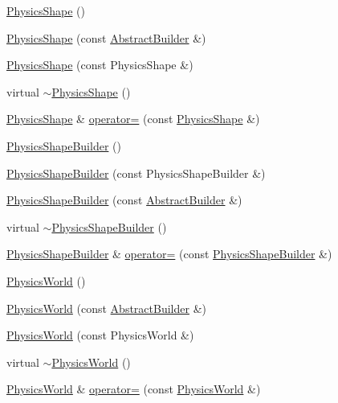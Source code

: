 \begin{DoxyCompactItemize}
\item 
\hyperlink{namespacejli_a5d762365fd3979a5b8f4eebe8a916892}{Physics\+Shape} ()
\item 
\hyperlink{namespacejli_a2c1e26825311f621ee078252a29461ca}{Physics\+Shape} (const \hyperlink{classjli_1_1_abstract_builder}{Abstract\+Builder} \&)
\item 
\hyperlink{namespacejli_a972bcb3073388c79c38278a37c0fba83}{Physics\+Shape} (const Physics\+Shape \&)
\item 
virtual \hyperlink{namespacejli_afd6ccdd598deb11b40538c5fad1b5477}{$\sim$\+Physics\+Shape} ()
\item 
\hyperlink{namespacejli_a5d762365fd3979a5b8f4eebe8a916892}{Physics\+Shape} \& \hyperlink{namespacejli_a7e2664c542fe138299889c24fca38c7e}{operator=} (const \hyperlink{namespacejli_a5d762365fd3979a5b8f4eebe8a916892}{Physics\+Shape} \&)
\item 
\hyperlink{namespacejli_a24992ac1c3858db95ba078eac205adc7}{Physics\+Shape\+Builder} ()
\item 
\hyperlink{namespacejli_af8521f0e610100e574ceb1c001582b5a}{Physics\+Shape\+Builder} (const Physics\+Shape\+Builder \&)
\item 
\hyperlink{namespacejli_a7506589a40ec7b7bd1b48d258fdc1330}{Physics\+Shape\+Builder} (const \hyperlink{classjli_1_1_abstract_builder}{Abstract\+Builder} \&)
\item 
virtual \hyperlink{namespacejli_ae1e0786ad4fd198909d0c1c625a624cc}{$\sim$\+Physics\+Shape\+Builder} ()
\item 
\hyperlink{namespacejli_a24992ac1c3858db95ba078eac205adc7}{Physics\+Shape\+Builder} \& \hyperlink{namespacejli_af6d5c0ddeeb0d245763a8bdccf963738}{operator=} (const \hyperlink{namespacejli_a24992ac1c3858db95ba078eac205adc7}{Physics\+Shape\+Builder} \&)
\item 
\hyperlink{namespacejli_a84f1f097c95cf1e48c0df5bec2f2b262}{Physics\+World} ()
\item 
\hyperlink{namespacejli_ad987fadc433080865f227046a5f33d25}{Physics\+World} (const \hyperlink{classjli_1_1_abstract_builder}{Abstract\+Builder} \&)
\item 
\hyperlink{namespacejli_a8aed3494aa3e6d4360421e5b935c5b94}{Physics\+World} (const Physics\+World \&)
\item 
virtual \hyperlink{namespacejli_a1ac2ddeeb10a25593e741142a7d1524e}{$\sim$\+Physics\+World} ()
\item 
\hyperlink{namespacejli_a84f1f097c95cf1e48c0df5bec2f2b262}{Physics\+World} \& \hyperlink{namespacejli_af199e55a0897e5102c8314f78c34775c}{operator=} (const \hyperlink{namespacejli_a84f1f097c95cf1e48c0df5bec2f2b262}{Physics\+World} \&)

\end{DoxyCompactItemize}
